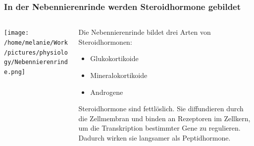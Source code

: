 \documentclass{beamer}
\begin{document}
\begin{frame}
\frametitle{In der Nebennierenrinde werden Steroidhormone gebildet}

\begin{columns}[c]

\begin{column}{6cm}
\texttt{[image: /home/melanie/Work/pictures/physiology/Nebennierenrinde.png]}
\end{column}

\begin{column}{5cm}

Die Nebennierenrinde bildet drei Arten von Steroidhormonen:
\begin{itemize}
\item
Glukokortikoide
\item
Mineralokortikoide
\item
Androgene
\end{itemize}

\pause

Steroidhormone sind fettlöslich. Sie diffundieren durch die Zellmembran und binden an Rezeptoren im Zellkern, um die Transkription bestimmter Gene zu regulieren. Dadurch wirken sie langsamer als Peptidhormone. 

\end{column}

\end{columns}

\end{frame}

\end{document}
